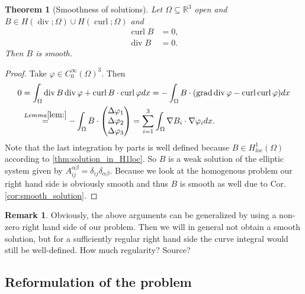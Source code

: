 \documentclass[12pt,a4paper]{article}
\numberwithin{equation}{subsection}
\numberwithin{lemma}{subsection}
\newtheorem{theorem}[lemma]{Theorem}
\theoremstyle{definition}
\newtheorem{remark}[lemma]{Remark}
\DeclareMathOperator{\curl}{curl}
\DeclareMathOperator{\diver}{div}
\DeclareMathOperator{\grad}{grad}
\newcommand{\real}{\mathbb{R}}
\begin{document}
\begin{theorem}[Smoothness of solutions]
    Let $\Omega \subseteq \real^3$ open and 
    $B \in H(\diver;\Omega) \cup H(\curl;\Omega)$ and 
    \begin{align*}
        \curl B &= 0,
        \\ \diver B &= 0.
    \end{align*}
    Then $B$ is smooth.
\end{theorem}
\begin{proof}
    Take $\varphi \in C_0^\infty(\Omega)^3$. Then 
    \begin{align*}
        0 &= \int_\Omega \diver B \diver \varphi + \curl B \cdot \curl \varphi dx
        = - \int_\Omega B \cdot (\grad \diver \varphi - \curl \curl \varphi) dx
        \\ &\stackrel{Lemma \ref{lem:}}{=} - \int_\Omega B \cdot 
            \begin{pmatrix}
                \Delta \varphi_1 \\ \Delta \varphi_2 \\ \Delta \varphi_3
            \end{pmatrix}
        = \sum\limits_{i=1}^3 \int_\Omega \nabla B_i \cdot \nabla \varphi_i dx.
    \end{align*}
    Note that the last integration by parts is well defined because 
    $B \in H^1_{loc}(\Omega)$ according to \ref{thm:solution_in_H1loc}. 
    So $B$ is a weak solution 
    of the elliptic system given by 
    $A_{ij}^{\alpha \beta} = \delta_{ij} \delta_{\alpha\beta}$. Because 
    we look at the homogenous problem our right hand side is obviously smooth 
    and thus $B$ is smooth as well due to Cor.\,\ref{cor:smooth_solution}.
\end{proof}

\begin{remark}
    Obviously, the above arguments can be generalized by using a 
    non-zero right hand side of our problem. Then we will in general 
    not obtain a smooth solution, but for a sufficiently regular right hand 
    side the curve integral would still be well-defined.
    {\color{red} How much regularity? Source?}
\end{remark}


\subsection{Reformulation of the problem} 
\end{document}
